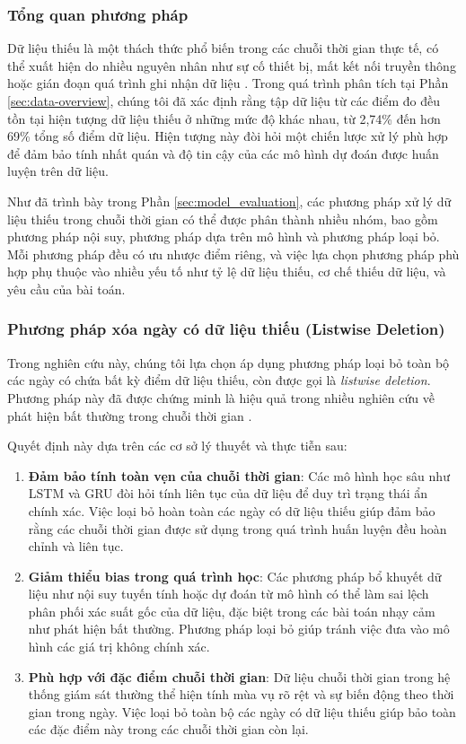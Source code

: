 \subsubsection{Tổng quan phương pháp}
Dữ liệu thiếu là một thách thức phổ biến trong các chuỗi thời gian thực tế, có thể xuất hiện do nhiều nguyên nhân như sự cố thiết bị, mất kết nối truyền thông hoặc gián đoạn quá trình ghi nhận dữ liệu \cite{schafer2002missing}. Trong quá trình phân tích tại Phần \ref{sec:data-overview}, chúng tôi đã xác định rằng tập dữ liệu từ các điểm đo đều tồn tại hiện tượng dữ liệu thiếu ở những mức độ khác nhau, từ 2,74\% đến hơn 69\% tổng số điểm dữ liệu. Hiện tượng này đòi hỏi một chiến lược xử lý phù hợp để đảm bảo tính nhất quán và độ tin cậy của các mô hình dự đoán được huấn luyện trên dữ liệu.

Như đã trình bày trong Phần \ref{sec:model_evaluation}, các phương pháp xử lý dữ liệu thiếu trong chuỗi thời gian có thể được phân thành nhiều nhóm, bao gồm phương pháp nội suy, phương pháp dựa trên mô hình và phương pháp loại bỏ. Mỗi phương pháp đều có ưu nhược điểm riêng, và việc lựa chọn phương pháp phù hợp phụ thuộc vào nhiều yếu tố như tỷ lệ dữ liệu thiếu, cơ chế thiếu dữ liệu, và yêu cầu của bài toán.

\subsubsection{Phương pháp xóa ngày có dữ liệu thiếu (Listwise Deletion)}
Trong nghiên cứu này, chúng tôi lựa chọn áp dụng phương pháp loại bỏ toàn bộ các ngày có chứa bất kỳ điểm dữ liệu thiếu, còn được gọi là \textit{listwise deletion}. Phương pháp này đã được chứng minh là hiệu quả trong nhiều nghiên cứu về phát hiện bất thường trong chuỗi thời gian \cite{malhotra2016lstm, hundman2018detecting}.

Quyết định này dựa trên các cơ sở lý thuyết và thực tiễn sau:

\begin{enumerate}
    \item \textbf{Đảm bảo tính toàn vẹn của chuỗi thời gian}: Các mô hình học sâu như LSTM và GRU đòi hỏi tính liên tục của dữ liệu để duy trì trạng thái ẩn chính xác. Việc loại bỏ hoàn toàn các ngày có dữ liệu thiếu giúp đảm bảo rằng các chuỗi thời gian được sử dụng trong quá trình huấn luyện đều hoàn chỉnh và liên tục.
    
    \item \textbf{Giảm thiểu bias trong quá trình học}: Các phương pháp bổ khuyết dữ liệu như nội suy tuyến tính hoặc dự đoán từ mô hình có thể làm sai lệch phân phối xác suất gốc của dữ liệu, đặc biệt trong các bài toán nhạy cảm như phát hiện bất thường. Phương pháp loại bỏ giúp tránh việc đưa vào mô hình các giá trị không chính xác.
    
    \item \textbf{Phù hợp với đặc điểm chuỗi thời gian}: Dữ liệu chuỗi thời gian trong hệ thống giám sát thường thể hiện tính mùa vụ rõ rệt và sự biến động theo thời gian trong ngày. Việc loại bỏ toàn bộ các ngày có dữ liệu thiếu giúp bảo toàn các đặc điểm này trong các chuỗi thời gian còn lại.
\end{enumerate}


